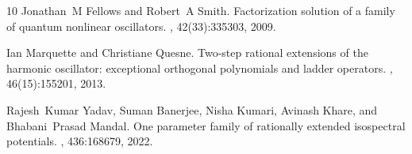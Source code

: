 \documentclass[11pt]{article}
\begin{document}
\begin{thebibliography}{10}
Jonathan~M Fellows and Robert~A Smith.
\newblock Factorization solution of a family of quantum nonlinear oscillators.
,
  42(33):335303, 2009.

Ian Marquette and Christiane Quesne.
\newblock Two-step rational extensions of the harmonic oscillator: exceptional
  orthogonal polynomials and ladder operators.
,
  46(15):155201, 2013.

Rajesh~Kumar Yadav, Suman Banerjee, Nisha Kumari, Avinash Khare, and
  Bhabani~Prasad Mandal.
\newblock One parameter family of rationally extended isospectral potentials.
, 436:168679, 2022.

\end{thebibliography}
\end{document}
